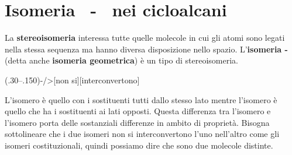 \section{Isomeria \cis\texorpdfstring{\,\!}{} - \trans\texorpdfstring{\,\!}{} nei cicloalcani}
La \textbf{stereoisomeria} interessa tutte quelle molecole in cui gli atomi sono legati nella stessa sequenza ma hanno diversa disposizione nello spazio. L'\textbf{isomeria \cis-\trans\;\!} (detta anche \textbf{isomeria geometrica}) è un tipo di stereoisomeria.

\begingroup
{}
\begin{reaction*}
	\arrow(.30--.150){-/>[non si][interconvertono]}
\end{reaction*}
\endgroup

L'isomero \cis\;\! è quello con i sostituenti tutti dallo stesso lato mentre l'isomero \trans\;\! è quello che ha i sostituenti ai lati opposti. Questa differenza tra l'isomero \cis\;\! e l'isomero \trans\;\! porta delle sostanziali differenze in ambito di proprietà.  Bisogna sottolineare che i due isomeri non si interconvertono l'uno nell'altro come gli isomeri costituzionali, quindi possiamo dire che sono due molecole distinte.
